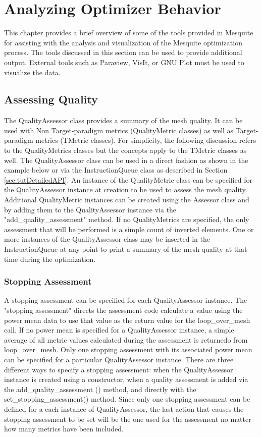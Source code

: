 \chapter{Analyzing Optimizer Behavior}

This chapter provides a brief overview of some of the tools provided in Mesquite for assisting with the analysis and visualization of the Mesquite optimization process.  The tools discussed in this section can be used to provide additional output.  External tools such as Paraview, VisIt, or GNU Plot must be used to visualize the data.

\section{Assessing Quality}

  The QualityAssessor class provides a summary of the mesh quality. It can be used with Non Target-paradigm metrics (QualityMetric classes) as well as Target-paradigm metrics (TMetric classes). For simplicity, the following discussion refers to the QualityMetrics classes but the concepts apply to the TMetric classes as well.  The QualityAssessor class can be used in a direct fashion as shown in the example below or via the InstructionQueue class as described in Section \ref{sec:tutDetailedAPI}.  An instance of the QualityMetric class can be specified for the QualityAssessor instance at creation to be used to assess the mesh quality.  Additional QualityMetric instances can be created using the Assessor class and by adding them to the QualityAssessor instance via the "add\_quality\_assessment" method. If no QualityMetrics are specified, the only assessment that will be performed is a simple count of inverted elements. One or more instances of the QualityAssessor class may be inserted in the InstructionQueue at any point to print a summary of the mesh quality at that time during the optimization.

\subsection{Stopping Assessment}

A stopping assessment can be specified for each QualityAssessor instance.  The "stopping assessment" directs the assessment code calculate a value using the power mean data to use that value as the return value for the loop\_over\_mesh call.  If no power mean is specified for a QualityAssessor instance, a simple average of all metric values calculated during the assessment is returnedo from  loop\_over\_mesh.  Only one stopping assessment with its associated power mean can be specified for a particular QualityAssessor instance.  There are three different ways to specify a stopping assessment: when the QualityAssessor instance is created using a constructor, when a quality assessment is added via the add\_quality\_assessment () method, and directly with the set\_stopping\_assessment() method.  Since only one stopping assessment can be defined for a each instance of QualityAssessor, the last action that causes the stopping assessment to be set will be the one used for the assessment no matter how many metrics have been included.

